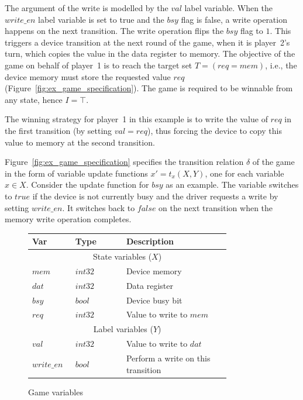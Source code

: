 The argument of the write is modelled by the $val$ label variable. When the $write\_en$ label variable is set to true and the $bsy$ flag is false, a write operation happens on the next transition. The write operation flips the $bsy$ flag to $1$.  This triggers a device transition at the next round of the game, when it is player~2's turn, which copies the value in the data register to memory.  The objective of the game on behalf of player~1 is to reach the target set $T=(req=mem)$, i.e., the device memory must store the requested value $req$ (Figure~\ref{fig:ex_game_specification}). The game is required to be winnable from any state, hence $I=\top$.  

The winning strategy for player~1 in this example is to write the value of $req$ in the first transition (by setting $val=req$), thus forcing the device to copy this value to memory at the second transition.

Figure~\ref{fig:ex_game_specification} specifies the transition relation $\delta$ of the game in the form of variable update functions $x' = t_x(X,Y)$, one for each variable $x\in X$.  Consider the update function for $bsy$ as an example.  The variable switches to $true$ if the device is not currently busy and the driver requests a write by setting $write\_en$. It switches back to $false$ on the next transition when the memory write operation completes.

\begin{figure}
    \centering
    \caption{Game variables}
    \label{fig:ex_game_variables}
    \begin{tabular}{|p{0.13\linewidth}p{0.22\linewidth}p{0.45\linewidth}|}
        \hline
        {\bf Var} & {\bf Type} & {\bf Description} \\
        \hline\hline
        \multicolumn{3}{|c|}{State variables ($X$)} \\
        \hline
        $mem$ & $int32$ & Device memory           \\
        $dat$ & $int32$ & Data register           \\
        $bsy$ & $bool$  & Device busy bit         \\
        $req$ & $int32$ & Value to write to $mem$ \\
        \hline\hline
        \multicolumn{3}{|c|}{Label variables ($Y$)}    \\
        \hline
        $val$       & $int32$ & Value to write to $dat$ \\
        $write\_en$ & $bool$  & Perform a write on this transition \\
        \hline
    \end{tabular}
\end{figure}

